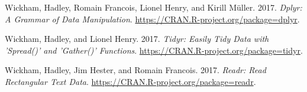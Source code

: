 \documentclass[]{book}
\begin{document}
\leavevmode\hypertarget{ref-R-dplyr}{}%
Wickham, Hadley, Romain Francois, Lionel Henry, and Kirill Müller. 2017. \emph{Dplyr: A Grammar of Data Manipulation}. \url{https://CRAN.R-project.org/package=dplyr}.

\leavevmode\hypertarget{ref-R-tidyr}{}%
Wickham, Hadley, and Lionel Henry. 2017. \emph{Tidyr: Easily Tidy Data with 'Spread()' and 'Gather()' Functions}. \url{https://CRAN.R-project.org/package=tidyr}.

\leavevmode\hypertarget{ref-R-readr}{}%
Wickham, Hadley, Jim Hester, and Romain Francois. 2017. \emph{Readr: Read Rectangular Text Data}. \url{https://CRAN.R-project.org/package=readr}.
\end{document}
